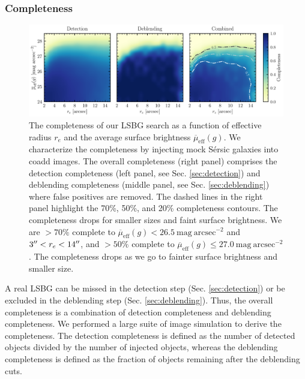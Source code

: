 \documentclass[twocolumn,astrosymb,twocolappendix]{aastex631}
\newcommand{\sbunit}{\mathrm{mag\ arcsec}^{-2}}
\newcommand{\sbeff}{\overline{\mu}_{\mathrm{eff}}(g)}
\newcommand{\sersic}{S\'ersic}
\begin{document}
\begin{CJK*}{UTF8}{gbsn}
\subsubsection{Completeness}\label{sec:completeness}
\begin{figure}
	\vbox{ 
		\centering
		\includegraphics[width=1\linewidth]{completeness.pdf}
	}
	\caption{The completeness of our LSBG search as a function of effective radius $r_e$ and the average surface brightness $\sbeff$. We characterize the completeness by injecting mock \sersic{} galaxies into coadd images. The overall completeness (right panel) comprises the detection completeness (left panel, see Sec. \ref{sec:detection}) and deblending completeness (middle panel, see Sec. \ref{sec:deblending}) where false positives are removed. The dashed lines in the right panel highlight the 70\%, 50\%, and 20\% completeness contours. The completeness drops for smaller sizes and faint surface brightness. We are $>70\%$ complete to $\sbeff < 26.5\ \sbunit$ and $3\mbox{$^{\prime\prime}$} < r_e < 14\mbox{$^{\prime\prime}$}$, and $>50\%$ complete to $\sbeff \leqslant 27.0\ \sbunit$. The completeness drops as we go to fainter surface brightness and smaller size. 
	}
	\label{fig:completeness}
\end{figure}

A real LSBG can be missed in the detection step (Sec. \ref{sec:detection}) or be excluded in the deblending step (Sec. \ref{sec:deblending}). Thus, the overall completeness is a combination of detection completeness and deblending completeness. We performed a large suite of image simulation to derive the completeness. The detection completeness is defined as the number of detected objects divided by the number of injected objects, whereas the deblending completeness is defined as the fraction of objects remaining after the deblending cuts. 


\end{CJK*}
\end{document}
